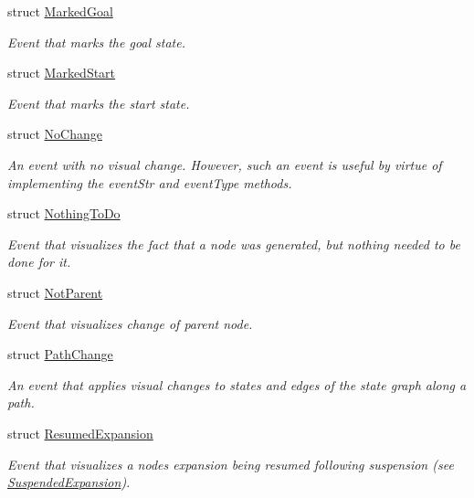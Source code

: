 \begin{DoxyCompactItemize}
struct \hyperlink{structslb_1_1ext_1_1event_1_1MarkedGoal}{Marked\+Goal}
\begin{DoxyCompactList}\small\item\em Event that marks the goal state. \end{DoxyCompactList}\item 
struct \hyperlink{structslb_1_1ext_1_1event_1_1MarkedStart}{Marked\+Start}
\begin{DoxyCompactList}\small\item\em Event that marks the start state. \end{DoxyCompactList}\item 
struct \hyperlink{structslb_1_1ext_1_1event_1_1NoChange}{No\+Change}
\begin{DoxyCompactList}\small\item\em An event with no visual change. However, such an event is useful by virtue of implementing the {\ttfamily event\+Str} and {\ttfamily event\+Type} methods. \end{DoxyCompactList}\item 
struct \hyperlink{structslb_1_1ext_1_1event_1_1NothingToDo}{Nothing\+To\+Do}
\begin{DoxyCompactList}\small\item\em Event that visualizes the fact that a node was generated, but nothing needed to be done for it. \end{DoxyCompactList}\item 
struct \hyperlink{structslb_1_1ext_1_1event_1_1NotParent}{Not\+Parent}
\begin{DoxyCompactList}\small\item\em Event that visualizes change of parent node. \end{DoxyCompactList}\item 
struct \hyperlink{structslb_1_1ext_1_1event_1_1PathChange}{Path\+Change}
\begin{DoxyCompactList}\small\item\em An event that applies visual changes to states and edges of the state graph along a path. \end{DoxyCompactList}\item 
struct \hyperlink{structslb_1_1ext_1_1event_1_1ResumedExpansion}{Resumed\+Expansion}
\begin{DoxyCompactList}\small\item\em Event that visualizes a node\textquotesingle{}s expansion being resumed following suspension (see \hyperlink{structslb_1_1ext_1_1event_1_1SuspendedExpansion}{Suspended\+Expansion}). \end{DoxyCompactList}\item 

\end{DoxyCompactItemize}
